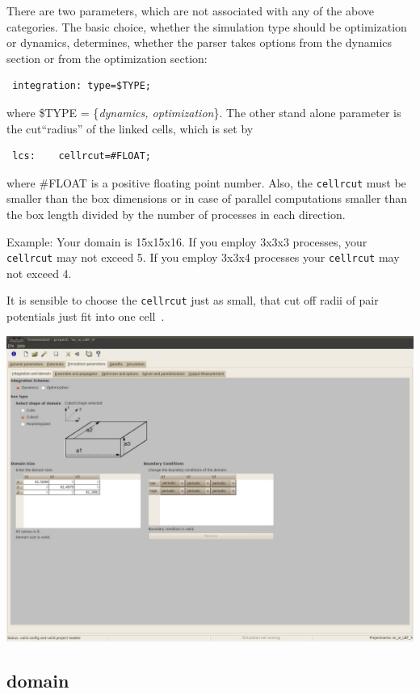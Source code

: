 There are two parameters, which are not associated with any of the above categories. The basic choice, whether the simulation type should be optimization or dynamics, determines, whether the parser takes options from the dynamics section or from the optimization section:
\begin{lstlisting}
 integration: type=$TYPE;
\end{lstlisting}
where \$TYPE = \{\textit{dynamics, optimization}\}.
\bigbreak
The other stand alone parameter is the cut``radius'' of the linked cells, which is set by
\begin{lstlisting}
 lcs:    cellrcut=#FLOAT;
\end{lstlisting}
where \#FLOAT is a positive floating point number. Also, the \texttt{cellrcut} must be smaller than the box dimensions or in case of parallel computations smaller than the box length divided by the number of processes in each direction.

Example: Your domain is 15x15x16. If you employ 3x3x3 processes, your \texttt{cellrcut} may not exceed 5. If you employ 3x3x4 processes your \texttt{cellrcut} may not exceed 4.

It is sensible to choose the \texttt{cellrcut} just as small, that cut off radii of pair potentials just fit into one cell~\cite{GriebelEng}.

\includegraphics[width=15cm]{visuals/GUI_Parameter_Integration_Domain.jpg}
\subsection{domain}
\label{sub:domain}

